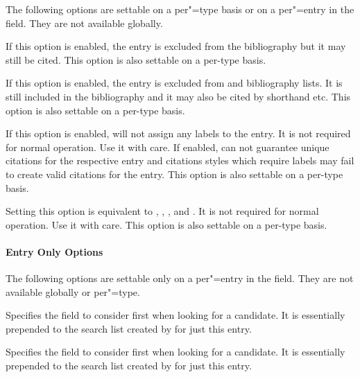 \documentclass{ltxdockit}[2011/03/25]
\newcommand*{\biblatex}{\sty{biblatex}\xspace}
\begin{document}
The following options are settable on a per"=type basis or on a per"=entry in the  field. They are not available globally.

\begin{optionlist}


If this option is enabled, the entry is excluded from the bibliography but it may still be cited.
This option is also settable on a per-type basis.


If this option is enabled, the entry is excluded from and bibliography lists. It is still included in the bibliography and it may also be cited by shorthand etc.
This option is also settable on a per-type basis.


If this option is enabled, \biblatex will not assign any labels to the entry. It is not required for normal operation. Use it with care. If enabled, \biblatex can not guarantee unique citations for the respective entry and citations styles which require labels may fail to create valid citations for the entry.
This option is also settable on a per-type basis.


Setting this option is equivalent to , , , and . It is not required for normal operation. Use it with care.
This option is also settable on a per-type basis.

\paragraph{Entry Only Options}
\label{use:opt:bib:entry}

The following options are settable only on a per"=entry in the  field. They are not available globally or per"=type.


Specifies the field to consider first when looking for a  candidate. It is essentially prepended to the search list created by  for just this entry.


Specifies the field to consider first when looking for a  candidate. It is essentially prepended to the search list created by  for just this entry.

\end{optionlist}
\end{document}
